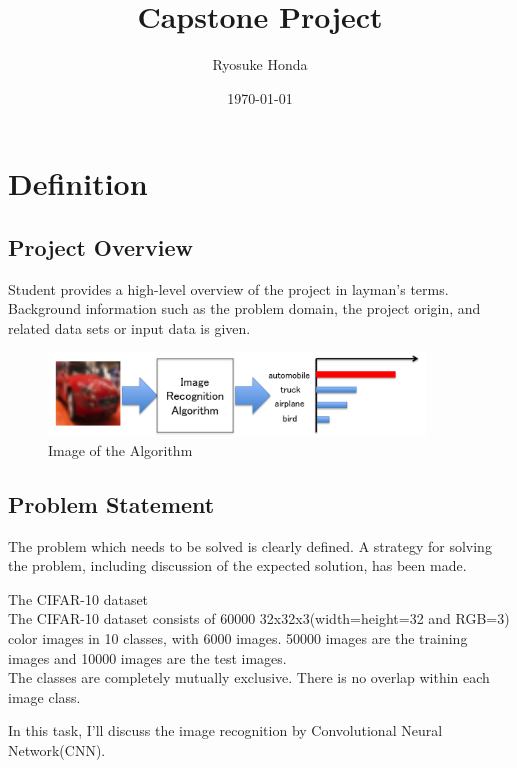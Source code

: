 \documentclass[a4paper,10pt,fleqn]{article}
\title{{\Huge Capstone Project}}%
\author{Ryosuke Honda}
\date{\today}
\begin{document}
\maketitle

\section{Definition}
\subsection{Project Overview}
Student provides a high-level overview of the project in layman’s terms. Background information such as the problem domain, the project origin, and related data sets or input data is given.


\begin{figure}[htbp]

\begin{center}
\includegraphics[width=10cm]{picture/Image_Recognition.png}
\end{center}
\caption{Image of the Algorithm}
\label{fig:one}

\end{figure}



\subsection{Problem Statement}
The problem which needs to be solved is clearly defined. A strategy for solving the problem, including discussion of the expected solution, has been made.







{\Large The CIFAR-10 dataset}\\
The CIFAR-10 dataset consists of 60000 32x32x3(width=height=32 and RGB=3) color images in 10 classes, with 6000 images. 50000 images are the training images and 10000 images are the test images.\\
The classes are completely mutually exclusive. There is no overlap within each image class.

In this task, I'll discuss the image recognition by Convolutional Neural Network(CNN).
\end{document}
